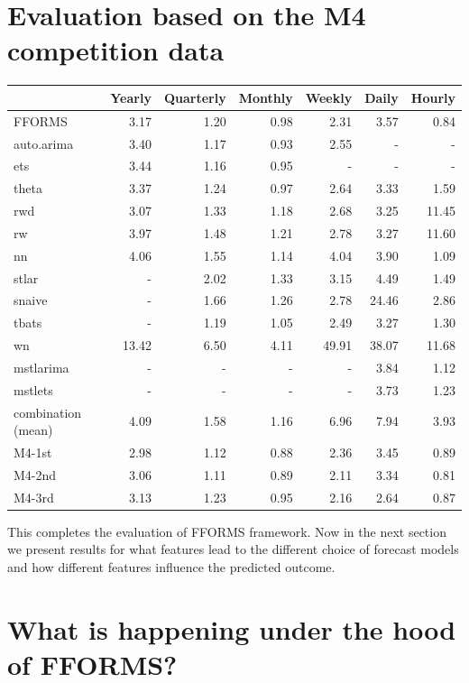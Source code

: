 \documentclass[11pt,a4paper,]{article}
\begin{document}
\hypertarget{results1}{%
\section{Evaluation based on the M4 competition data}\label{results1}}

\begin{table}[!h]
\centering\scriptsize\tabcolsep=0.12cm
\begin{tabular}{l|rrrrrr}
 & Yearly & Quarterly & Monthly & Weekly & Daily & Hourly \\\hline
FFORMS & 3.17 &  1.20 &  0.98&  2.31& 3.57 &  0.84\\\hline
auto.arima & 3.40 &1.17  &0.93  & 2.55 &  -& - \\
ets & 3.44 &  1.16& 0.95 &  -&-  &  -\\
theta & 3.37 &1.24  & 0.97 &2.64  & 3.33 & 1.59 \\
rwd & 3.07 & 1.33 & 1.18  & 2.68  & 3.25 & 11.45 \\
rw & 3.97 & 1.48 & 1.21  &2.78  & 3.27 & 11.60 \\
nn & 4.06 & 1.55 &  1.14 &4.04 & 3.90 & 1.09 \\
stlar & - & 2.02 &  1.33& 3.15 & 4.49 & 1.49 \\
snaive & - &  1.66& 1.26 &  2.78& 24.46 & 2.86 \\
tbats & - & 1.19 &  1.05& 2.49 & 3.27 &  1.30\\
wn & 13.42 &  6.50&  4.11&  49.91& 38.07 & 11.68 \\
mstlarima & - & - &  - & - & 3.84 &  1.12\\
mstlets & - &  - &  - &  - & 3.73 &  1.23\\
combination (mean) & 4.09 & 1.58 &  1.16&6.96  & 7.94 & 3.93 \\\hline
M4-1st & 2.98 & 1.12 &  0.88& 2.36 & 3.45 & 0.89\\
M4-2nd & 3.06 & 1.11 &  0.89& 2.11 & 3.34 & 0.81\\
M4-3rd & 3.13 & 1.23 &  0.95& 2.16 & 2.64 & 0.87\\\hline
\end{tabular}
\end{table}

This completes the evaluation of FFORMS framework. Now in the next section we present results for what features lead to the different choice of forecast models and how different features influence the predicted outcome.

\hypertarget{results2}{%
\section{What is happening under the hood of FFORMS?}\label{results2}}
\end{document}
